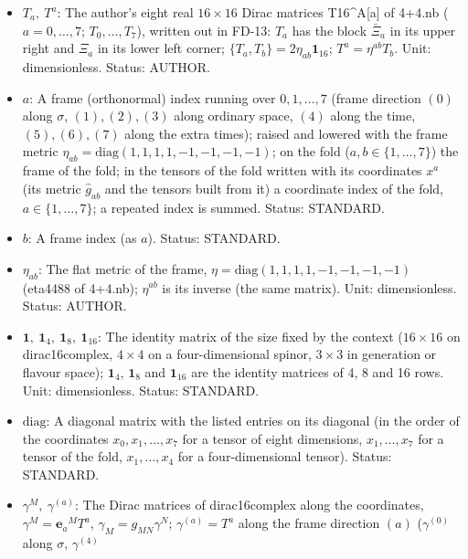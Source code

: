 \documentclass[
  10pt,
]{article}
\providecommand{\tightlist}{%
  \setlength{\itemsep}{0pt}\setlength{\parskip}{0pt}}
\begin{document}
\begin{itemize}
\tightlist
\item
  \(T_a,\ T^a\): The author's eight real \(16 \times 16\) Dirac matrices
  T16\^{}A{[}a{]} of 4+4.nb (\(a = 0, \dots, 7\); \(T_0, \dots, T_7\)),
  written out in FD-13: \(T_a\) has the block \(\bar\Xi_a\) in its upper
  right and \(\Xi_a\) in its lower left corner;
  \(\{T_a, T_b\} = 2\eta_{ab}\mathbf{1}_{16}\); \(T^a = \eta^{ab}T_b\).
  Unit: dimensionless. Status: AUTHOR.
\item
  \(a\): A frame (orthonormal) index running over \(0, 1, \dots, 7\)
  (frame direction \((0)\) along \(\sigma\), \((1), (2), (3)\) along
  ordinary space, \((4)\) along the time, \((5), (6), (7)\) along the
  extra times); raised and lowered with the frame metric
  \(\eta_{ab} = \mathrm{diag}(1, 1, 1, 1, -1, -1, -1, -1)\); on the fold
  (\(a, b \in \{1, \dots, 7\}\)) the frame of the fold; in the tensors
  of the fold written with its coordinates \(x^a\) (its metric
  \(\hat g_{ab}\) and the tensors built from it) a coordinate index of
  the fold, \(a \in \{1, \dots, 7\}\); a repeated index is summed.
  Status: STANDARD.
\item
  \(b\): A frame index (as \(a\)). Status: STANDARD.
\item
  \(\eta_{ab}\): The flat metric of the frame,
  \(\eta = \mathrm{diag}(1, 1, 1, 1, -1, -1, -1, -1)\) (eta4488 of
  4+4.nb); \(\eta^{ab}\) is its inverse (the same matrix). Unit:
  dimensionless. Status: AUTHOR.
\item
  \(\mathbf{1},\ \mathbf{1}_4,\ \mathbf{1}_8,\ \mathbf{1}_{16}\): The
  identity matrix of the size fixed by the context (\(16 \times 16\) on
  dirac16complex, \(4 \times 4\) on a four-dimensional spinor,
  \(3 \times 3\) in generation or flavour space); \(\mathbf{1}_4\),
  \(\mathbf{1}_8\) and \(\mathbf{1}_{16}\) are the identity matrices of
  4, 8 and 16 rows. Unit: dimensionless. Status: STANDARD.
\item
  \(\mathrm{diag}\): A diagonal matrix with the listed entries on its
  diagonal (in the order of the coordinates \(x_0, x_1, \dots, x_7\) for
  a tensor of eight dimensions, \(x_1, \dots, x_7\) for a tensor of the
  fold, \(x_1, \dots, x_4\) for a four-dimensional tensor). Status:
  STANDARD.
\item
  \(\gamma^M,\ \gamma^{(a)}\): The Dirac matrices of dirac16complex
  along the coordinates, \(\gamma^M = \mathbf{e}_a{}^MT^a\),
  \(\gamma_M = g_{MN}\gamma^N\); \(\gamma^{(a)} = T^a\) along the frame
  direction \((a)\) (\(\gamma^{(0)}\) along \(\sigma\), \(\gamma^{(4)}\)

\end{itemize}
\end{document}
